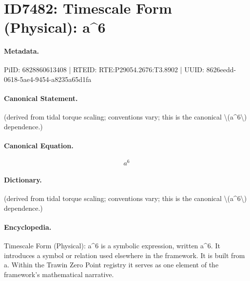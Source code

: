 \section*{ID7482: Timescale Form (Physical): a\textasciicircum{}6}
\paragraph{Metadata.}
PiID: 6828860613408 | RTEID: RTE:P29054.2676:T3.8902 | UUID: 8626eedd-0618-5ae4-9454-a8235a65d1fa

\paragraph{Canonical Statement.}
(derived from tidal torque scaling; conventions vary; this is the canonical \textbackslash{}(a\textasciicircum{}6\textbackslash{}) dependence.)

\paragraph{Canonical Equation.}
\[
a^6
\]

\paragraph{Dictionary.}
(derived from tidal torque scaling; conventions vary; this is the canonical \textbackslash{}(a\textasciicircum{}6\textbackslash{}) dependence.)

\paragraph{Encyclopedia.}
Timescale Form (Physical): a\textasciicircum{}6 is a symbolic expression, written a\textasciicircum{}6. It introduces a symbol or relation used elsewhere in the framework. It is built from a. Within the Trawin Zero Point registry it serves as one element of the framework's mathematical narrative.
